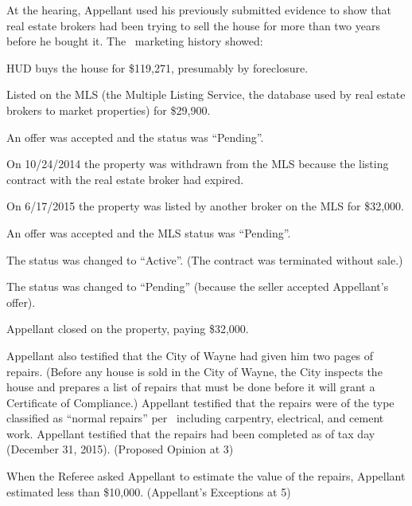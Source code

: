 \documentclass[12pt,\documentclassflag]{michiganCourtOfAppealsBrief}
\def\mathieuGast{\pincite[l]{MCL}{211.27(2)}}
\begin{document}
At the hearing, Appellant used his previously submitted evidence to show that real estate brokers had been trying to sell the house for more than two years before he bought it. The \MLS\ marketing history showed: 

\begin{description}[style=multiline,leftmargin=3cm,font=\normalfont,itemsep=.5\baselineskip,align=right]
\singlespacing 
\item[3/16/2005] HUD buys the house for \$119,271, presumably by foreclosure. 
\item[4/3/2013] Listed on the MLS (the Multiple Listing Service, the database used by real estate brokers to market properties) for \$29,900. 
\item[5/3/2013] An offer was accepted and the status was ``Pending''. 
\item[10/24/2013] On 10/24/2014 the property was withdrawn from the MLS because the listing contract with the real estate broker had expired. 
\item[6/17/2015] On 6/17/2015 the property was listed by another broker on the MLS for \$32,000. 
\item[6/29/2015] An offer was accepted and the MLS status was ``Pending''. 
\item[7/3/2015] The status was changed to ``Active''. (The contract was terminated without sale.) 
\item[7/6/2015] The status was changed to ``Pending'' (because the seller accepted Appellant's offer). 
\item[8/19/2015] Appellant closed on the property, paying \$32,000. 
\end{description}

Appellant also testified that the City of Wayne had given him two pages of repairs. (Before any house is sold in the City of Wayne, the City inspects the house and prepares a list of repairs that must be done before it will grant a Certificate of Compliance.) Appellant testified that the repairs were of the type classified as ``normal repairs'' per \mathieuGast\ including carpentry, electrical, and cement work. Appellant testified that the repairs had been completed as of tax day (December 31, 2015). (Proposed Opinion at 3)

When the Referee asked Appellant to estimate the value of the repairs, Appellant estimated less than \$10,000. (Appellant's Exceptions at 5)
\end{document}
